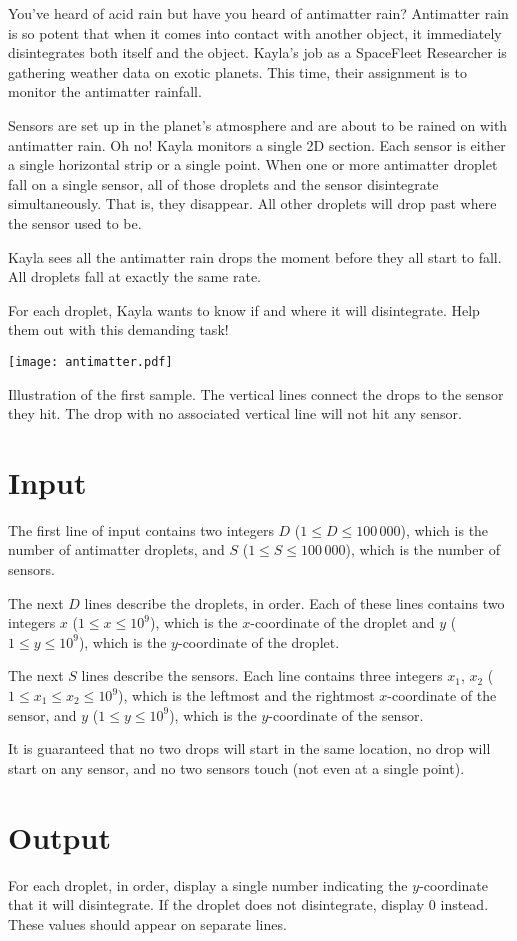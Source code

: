 
You've heard of acid rain but have you heard of antimatter rain?
Antimatter rain is so potent that when it comes into contact
with another object, it immediately disintegrates
both itself and the object.
Kayla's job as a SpaceFleet
Researcher is gathering weather data on exotic planets.
This time, their assignment is to monitor the antimatter
rainfall.

Sensors are set up in the planet's atmosphere and are about
to be rained on with antimatter rain. Oh no! Kayla monitors a
single 2D section. Each sensor is either a single horizontal strip
or a single point. When one or more antimatter droplet fall
on a single sensor, all of those droplets and the sensor
disintegrate simultaneously. That is, they disappear. All other
droplets will drop past where the sensor used to be.

Kayla sees all the antimatter rain drops the moment before
they all start to fall. All droplets fall at exactly the same
rate.

For each droplet, Kayla wants to know if and where it
will disintegrate. Help them out with this demanding task!

\begin{center}
 \texttt{[image: antimatter.pdf]}
\end{center}
Illustration of the first sample. The vertical lines connect
the drops to the sensor they hit. The drop with no associated vertical
line will not hit any sensor.

\section*{Input}

The first line of input contains two integers $D$ ($1 \leq D \leq 100\,000$),
which is the number of antimatter droplets, and $S$ ($1 \leq S \leq 100\,000$),
which is the number of sensors.

The next $D$ lines describe the droplets, in order. Each of these lines contains two
integers $x$ ($1 \leq x \leq 10^9$), which is the $x$-coordinate of the droplet
and $y$ ($1 \leq y \leq 10^9$), which is the $y$-coordinate of the droplet.

The next $S$ lines describe the sensors. Each line contains three integers
$x_1$, $x_2$ ($1 \leq x_1 \leq x_2 \leq 10^9$), which is the leftmost and the rightmost
$x$-coordinate of the sensor, and $y$ ($1 \leq y \leq 10^9$), which is the
$y$-coordinate of the sensor.

It is guaranteed that no two drops will start in the same location, no drop will
start on any sensor, and no two sensors touch (not even at a single point).

\section*{Output}
For each droplet, in order, display a single number indicating the $y$-coordinate that it will disintegrate.
If the droplet does not disintegrate, display $0$ instead.
These values should appear on separate lines.
